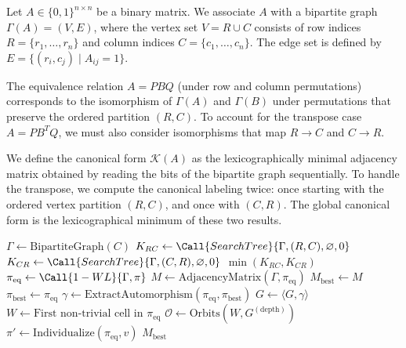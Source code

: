 \documentclass[reqno]{amsart}
\numberwithin{equation}{section}
\begin{document}
Let $A \in \{0,1\}^{n \times n}$ be a binary matrix. We associate $A$ with a bipartite graph $\Gamma(A) = (V, E)$, where the vertex set $V = R \cup C$ consists of row indices $R = \{r_1, \dots, r_n\}$ and column indices $C = \{c_1, \dots, c_n\}$. The edge set is defined by $E = \{ (r_i, c_j) \mid A_{ij} = 1 \}$. 

The equivalence relation $A = P B Q$ (under row and column permutations) corresponds to the isomorphism of $\Gamma(A)$ and $\Gamma(B)$ under permutations that preserve the ordered partition $(R, C)$. To account for the transpose case $A = P B^T Q$, we must also consider isomorphisms that map $R \to C$ and $C \to R$. 

We define the canonical form $\mathcal{K}(A)$ as the lexicographically minimal adjacency matrix obtained by reading the bits of the bipartite graph sequentially. To handle the transpose, we compute the canonical labeling twice: once starting with the ordered vertex partition $(R, C)$, and once with $(C, R)$. The global canonical form is the lexicographical minimum of these two results.




\begin{algorithm}[t]
\caption{Canonical Form via Individualization-Refinement}
\label{alg:canonical}
\begin{algorithmic}[1]
    \State $\Gamma \gets \text{BipartiteGraph}(C)$ 
    \State $K_{RC} \gets \Call{SearchTree}{\Gamma, (R, C), \varnothing, 0}$
    \State $K_{CR} \gets \Call{SearchTree}{\Gamma, (C, R), \varnothing, 0}$
    \State \Return $\min(K_{RC}, K_{CR})$
\EndProcedure
\Statex
{}
    \State $\pi_{\text{eq}} \gets \Call{1-WL}{\Gamma, \pi}$
        \State $M \gets \text{AdjacencyMatrix}(\Gamma, \pi_{\text{eq}})$
            \State $M_{\text{best}} \gets M$
            \State $\pi_{\text{best}} \gets \pi_{\text{eq}}$
            \State $\gamma \gets \text{ExtractAutomorphism}(\pi_{\text{eq}}, \pi_{\text{best}})$
            \State $G \gets \langle G, \gamma \rangle$ 
        \EndIf
        \State \Return
    \EndIf
    \State $W \gets \text{First non-trivial cell in } \pi_{\text{eq}}$
    \State $\mathcal{O} \gets \text{Orbits}(W, G^{(\text{depth})})$ 
        \State $\pi' \gets \text{Individualize}(\pi_{\text{eq}}, v)$ 
        \State {}
    \EndFor
    \State \Return $M_{\text{best}}$
\EndProcedure
\end{algorithmic}
\end{algorithm}
\end{document}
